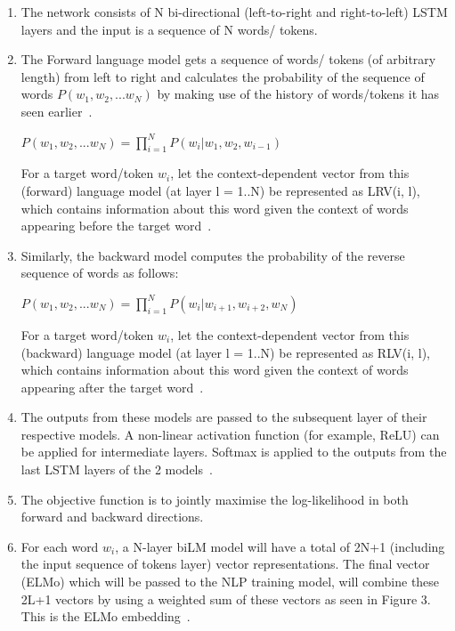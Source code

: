 \begin{enumerate}
    \item The network consists of N bi-directional (left-to-right and right-to-left) LSTM layers and the input is  a sequence of N words/ tokens. 
    
    \item The Forward language model gets a sequence of words/ tokens (of arbitrary length) from left to right and calculates the probability of the sequence of words  $P(w_1, w_2, ... w_N)$ by making use of the history of words/tokens it has seen earlier~\cite{elmo_word_rep}.
        \begin{center}
            $P(w_1, w_2, ... w_N) = \prod_{i = 1}^{N} P (w_i | w_{1}, w_{2}, w_{i-1})$ 
        \end{center}
        
        For a target word/token $w_i$, let the context-dependent vector from this (forward) language model (at layer l = 1..N) be represented as LRV(i, l), which contains information about this word given the context of words appearing before the target word~\cite{elmo_word_rep}.
        
     \item Similarly, the backward model computes the probability of the reverse sequence of words as follows:
        
        \begin{center}
            $P(w_1, w_2, ... w_N) = \prod_{i = 1}^{N} P (w_i | w_{i+1}, w_{i+2}, w_N)$
        \end{center}
        
        For a target word/token $w_i$, let the context-dependent vector from this (backward) language model (at layer l = 1..N) be represented as RLV(i, l), which contains information about this word given the context of words appearing after the target word~\cite{elmo_word_rep}.
        
        \item The outputs from these models are passed to the subsequent layer of their respective models. A non-linear activation function (for example, ReLU) can be applied for intermediate layers. Softmax is applied to the outputs from the last LSTM layers of the 2 models~\cite{context2vec}.
    
        \item The objective function is to jointly maximise the log-likelihood in both forward and backward directions.
        
        \item For each word $w_i$, a N-layer biLM model will have a total of 2N+1 (including the input sequence of tokens layer) vector representations. The final vector (ELMo) which will be passed to the NLP training model, will combine these 2L+1 vectors by using a weighted sum of these vectors as seen in Figure 3. This is the ELMo embedding~\cite{elmo_word_rep}.
    
\end{enumerate}